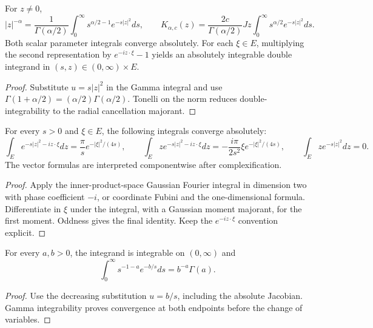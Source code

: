 \begin{lemma}
  \label{lem:c13_gamma_kernel_layers}
  For $z\ne0$,
  \[
    |z|^{-\alpha}=\frac1{\Gamma(\alpha/2)}\int_0^\infty
        s^{\alpha/2-1}e^{-s|z|^2}ds,\qquad
    K_{\alpha,c}(z)=\frac{2c}{\Gamma(\alpha/2)}Jz\int_0^\infty
        s^{\alpha/2}e^{-s|z|^2}ds.
  \]
  Both scalar parameter integrals converge absolutely. For each $\xi\in E$, multiplying the
  second representation by $e^{-iz\cdot\xi}-1$ yields an absolutely integrable double integrand
  in $(s,z)\in(0,\infty)\times E$.
\end{lemma}
\begin{proof}
  Substitute $u=s|z|^2$ in the Gamma integral and use
  $\Gamma(1+\alpha/2)=(\alpha/2)\Gamma(\alpha/2)$.
  Tonelli on the norm reduces double-integrability to the radial cancellation majorant.
\end{proof}

\begin{lemma}
  \label{lem:c13_gaussian_first_moment}
  For every $s>0$ and $\xi\in E$, the following integrals converge absolutely:
  \[
    \int_Ee^{-s|z|^2-i z\cdot\xi}dz=\frac\pi s e^{-|\xi|^2/(4s)},\qquad
    \int_E z e^{-s|z|^2-i z\cdot\xi}dz
       =-\frac{i\pi}{2s^2}\xi e^{-|\xi|^2/(4s)},\qquad
    \int_E z e^{-s|z|^2}dz=0.
  \]
  The vector formulas are interpreted componentwise after complexification.
\end{lemma}
\begin{proof}
  Apply the inner-product-space Gaussian Fourier integral in dimension two with
  phase coefficient $-i$, or coordinate Fubini and the one-dimensional formula.
  Differentiate in $\xi$ under the integral, with a Gaussian moment majorant, for the first moment.
  Oddness gives the final identity. Keep the $e^{-iz\cdot\xi}$ convention explicit.
\end{proof}

\begin{lemma}
  \label{lem:c13_inverse_gamma_integral}
  For every $a,b>0$, the integrand is integrable on $(0,\infty)$ and
  \[
    \int_0^\infty s^{-1-a}e^{-b/s}ds=b^{-a}\Gamma(a).
  \]
\end{lemma}
\begin{proof}
  Use the decreasing substitution $u=b/s$, including the absolute Jacobian.
  Gamma integrability proves convergence at both endpoints before the change of variables.
\end{proof}

